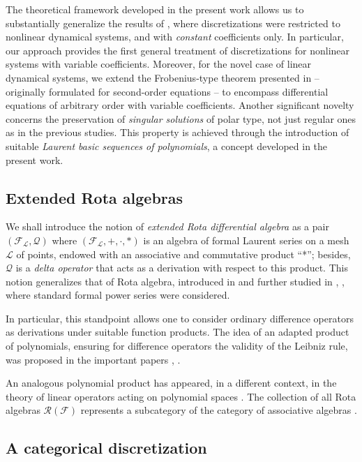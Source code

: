 \documentclass[10pt]{amsart}
\numberwithin{equation}{section}
\theoremstyle{definition}
\begin{document}
The theoretical framework developed in the present work allows us to substantially
generalize the results of \cite{TempestaJDE}, where discretizations were
restricted to nonlinear dynamical systems, and with \textit{constant} coefficients
only. In particular, our approach provides the first general treatment
of discretizations for nonlinear systems with variable coefficients. Moreover,
for the novel case of linear dynamical systems, we extend the Frobenius-type
theorem presented in \cite{RRT2025} -- originally formulated for second-order
equations -- to encompass differential equations of arbitrary order with
variable coefficients. Another significant novelty concerns the preservation
of \textit{singular solutions} of polar type, not just regular ones as in
the previous studies. This property is achieved through the introduction
of suitable \textit{Laurent basic sequences of polynomials}, a concept developed
in the present work.

\subsection{Extended Rota algebras}
\label{sec1.3}

We shall introduce the notion of
\textit{extended Rota differential algebra} as a pair
$\left (\mathcal{F_{\mathcal{L}}},\mathcal{Q}\right )$ where
$(\mathcal{F_{L}}, +,\cdot , *)$ is an algebra of formal Laurent series
on a mesh $\mathcal{L}$ of points, endowed with an associative and commutative
product ``*''; besides, $\mathcal{Q}$ is a \textit{delta operator}
\cite{Rota} that acts as a derivation with respect to this product. This
notion generalizes that of Rota algebra, introduced in
\cite{TempestaJDE} and further studied in \cite{RRT2025},
\cite{RT2024}, where standard formal power series were considered.

In particular, this standpoint allows one to consider ordinary difference operators
as derivations under suitable function products. The idea of an adapted
product of polynomials, ensuring for difference operators the validity
of the Leibniz rule, was proposed in the important papers \cite{Ward},
\cite{BF}.

An analogous polynomial product has appeared, in a different context, in
the theory of linear operators acting on polynomial spaces
\cite{ismail}. The collection of all Rota algebras
$\mathcal{R} (\mathcal{F}) $ represents a subcategory of the category of
associative algebras \cite{Mac Lane}.

\subsection{A categorical discretization}
\label{sec1.4}
\end{document}

